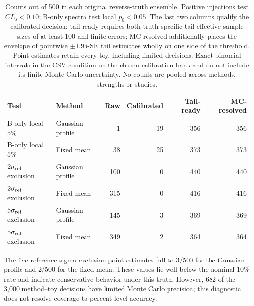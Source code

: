 \begin{table}[H]\centering\small

\begin{tabular}{llrrrr}\toprule

Test & Method & Raw & Calibrated & Tail-ready & MC-resolved\\\midrule

B-only local $5\%$ & Gaussian profile & 1 & 19 & 356 & 356\\

B-only local $5\%$ & Fixed mean & 38 & 25 & 373 & 373\\

$2\sigma_{\rm ref}$ exclusion & Gaussian profile & 100 & 0 & 440 & 440\\

$2\sigma_{\rm ref}$ exclusion & Fixed mean & 315 & 0 & 416 & 416\\

$5\sigma_{\rm ref}$ exclusion & Gaussian profile & 145 & 3 & 369 & 369\\

$5\sigma_{\rm ref}$ exclusion & Fixed mean & 349 & 2 & 364 & 364\\

\bottomrule\end{tabular}

\caption{Counts out of 500 in each original reverse-truth ensemble. Positive injections test $CL_s<0.10$; B-only spectra test local $p_0<0.05$. The last two columns qualify the calibrated decision: tail-ready requires both truth-specific tail effective sample sizes of at least 100 and finite errors; MC-resolved additionally places the envelope of pointwise $\pm1.96$-SE tail estimates wholly on one side of the threshold. Point estimates retain every toy, including limited decisions. Exact binomial intervals in the CSV condition on the chosen calibration bank and do not include its finite Monte Carlo uncertainty. No counts are pooled across methods, strengths or studies.}

\label{tab:reverse_truth_validation}\end{table}

The five-reference-sigma exclusion point estimates fall to 3/500 for the Gaussian profile and 2/500 for the fixed mean. These values lie well below the nominal 10\% rate and indicate conservative behavior under this truth. However, 682 of the 3,000 method--toy decisions have limited Monte Carlo precision; this diagnostic does not resolve coverage to percent-level accuracy.
